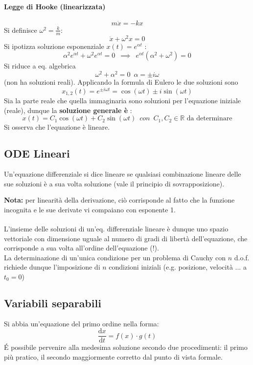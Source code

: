 \documentclass[10pt]{article}
\theoremstyle{plain}
\begin{document}
\paragraph*{Legge di Hooke (linearizzata)}
\[m\ddot x = - k x\]
Si definisce $\omega^2 = \frac{k}{m}$:
\[\ddot x + \omega^2 x = 0\]
Si ipotizza soluzione esponenziale $x(t) = e^{\alpha t}$ :
\[\alpha^2 e^{\alpha t} + \omega^2 e^{\alpha t} = 0 \enspace \implies \enspace e^{\alpha t} (\alpha^2 + \omega^2) = 0\]
Si riduce a eq. algebrica
\[\omega^2 + \alpha^2 = 0 \enspace \alpha = \pm i \omega\]
(non ha soluzioni reali). Applicando la formula di Eulero le due soluzioni sono
\[x_{1,2}(t) = e^{\pm i \omega t} = \cos(\omega t) \pm i \sin(\omega t)\]
Sia la parte reale che quella immaginaria sono soluzioni per l'equazione iniziale (reale), dunque la \textbf{soluzione generale è} :
\[\boxed{x(t) = C_1 \cos(\omega t) + C_2 \sin(\omega t)} \enspace con \enspace C_1, C_2 \in \mathbb{R} \textrm{ da determinare}\]
Si osserva che l'equazione è lineare.

\subsection{ODE Lineari}

\begin{defin}
    Un'equazione differenziale si dice lineare se qualsiasi combinazione lineare delle sue soluzioni è a sua volta soluzione (vale il principio di sovrapposizione).
\end{defin}
\textbf{Nota:} per linearità della derivazione, ciò corrisponde al fatto che la funzione incognita e le sue derivate vi compaiano con esponente 1.
\\~\\L'insieme delle soluzioni di un'eq. differenziale lineare è dunque uno spazio vettoriale con dimensione uguale al numero di gradi di libertà dell'equazione, che corrisponde a sua volta all'ordine dell'equazione (!).
\\La determinazione di un'unica condizione per un problema di Cauchy con $n$ d.o.f. richiede dunque l'imposizione di $n$ condizioni iniziali (e.g. posizione, velocità ... a $t_0=0$)

\subsection{Variabili separabili}
Si abbia un'equazione del primo ordine nella forma:
\[\frac{\textrm{d}x}{\textrm{d}t} = f(x) \cdot g(t)\]
\'E possibile pervenire alla medesima soluzione secondo due procedimenti: il primo più pratico, il secondo maggiormente corretto dal punto di vista formale.
\end{document}

